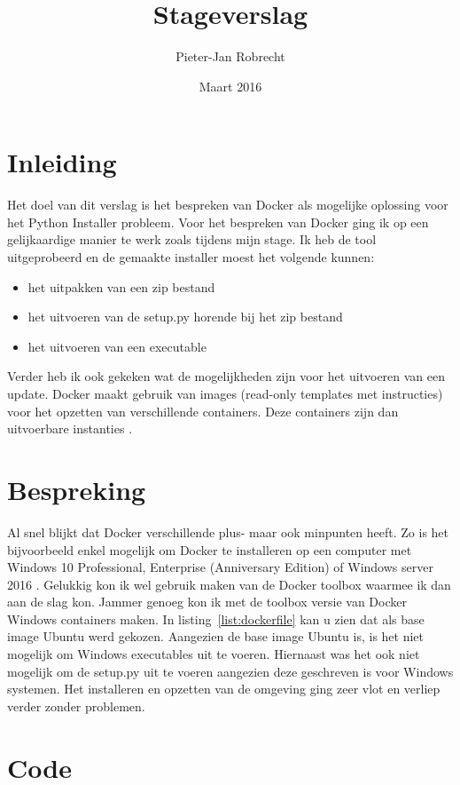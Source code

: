 \documentclass{article}
\title{Stageverslag}
\author{\mbox{Pieter-Jan} Robrecht}
\date{Maart 2016}
\begin{document}


\clearpage
\setcounter{page}{1}

\tableofcontents
\lstlistoflistings
\clearpage

\section{Inleiding}
Het doel van dit verslag is het bespreken van Docker als mogelijke oplossing voor het Python Installer probleem.
Voor het bespreken van Docker ging ik op een gelijkaardige manier te werk zoals tijdens mijn stage.
Ik heb de tool uitgeprobeerd en de gemaakte installer moest het volgende kunnen:
\begin{itemize}
\item het uitpakken van een zip bestand
\item het uitvoeren van de setup.py horende bij het zip bestand
\item het uitvoeren van een executable
\end{itemize}
Verder heb ik ook gekeken wat de mogelijkheden zijn voor het uitvoeren van een update.
Docker maakt gebruik van images (read-only templates met instructies) voor het opzetten van verschillende containers.
Deze containers zijn dan uitvoerbare instanties \citep{docker}.

\section{Bespreking}
Al snel blijkt dat Docker verschillende plus- maar ook minpunten heeft.
Zo is het bijvoorbeeld enkel mogelijk om Docker te installeren op een computer met Windows 10 Professional, Enterprise (Anniversary Edition) of Windows server 2016 \citep{microsoft}.
Gelukkig kon ik wel gebruik maken van de Docker toolbox waarmee ik dan aan de slag kon.
Jammer genoeg kon ik met de toolbox versie van Docker Windows containers maken.
In listing~\vref{list:dockerfile} kan u zien dat als base image Ubuntu werd gekozen.
Aangezien de base image Ubuntu is, is het niet mogelijk om Windows executables uit te voeren.
Hiernaast was het ook niet mogelijk om de setup.py uit te voeren aangezien deze geschreven is voor Windows systemen.
Het installeren en opzetten van de omgeving ging zeer vlot en verliep verder zonder problemen.


\section{Code}



%

\end{document}
